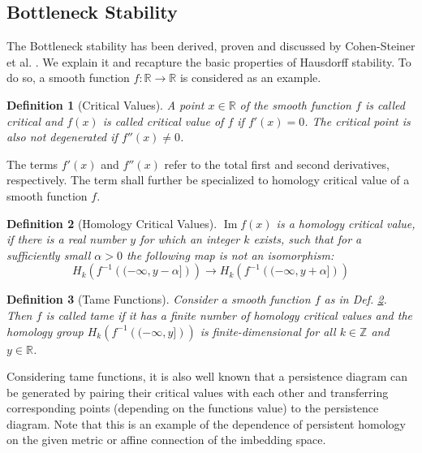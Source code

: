 \documentclass[journal]{IEEEtran}
\DeclareMathOperator{\Ima}{Im}
\newtheorem{definition}{Definition}[section]
\begin{document}
\subsection{Bottleneck Stability}
The Bottleneck stability has been derived, proven and discussed by Cohen-Steiner et al. \cite{Cohen-SteinerEH07}. We explain it and recapture the basic properties of Hausdorff stability. To do so, a smooth function $f: \mathbb{R} \rightarrow \mathbb{R}$ is considered as an example.

\begin{definition}[Critical Values]
A point $x \in \mathbb{R}$ of the smooth function $f$ is called critical and $f(x)$ is called critical value of $f$ if $f'(x) = 0$. The critical point is also not degenerated if $f''(x) \neq 0$.
\end{definition}

The terms $f'(x)$ and $f''(x)$ refer to the total first and second derivatives, respectively. The term shall further be specialized to homology critical value of a smooth function $f$.

\begin{definition}[Homology Critical Values]
\label{def:homcritval}
$\Ima f(x)$ is a homology critical value, if there is a real number $y$ for which an integer $k$ exists, such that for a sufficiently small $\alpha >0$ the following map is not an isomorphism:
\begin{equation}
H_k\left(f^{-1}\left((-\infty,y-\alpha]\right)\right)\rightarrow H_k\left(f^{-1}\left((-\infty,y+\alpha]\right)\right)
\end{equation}
\end{definition}

\begin{definition}[Tame Functions]
\label{def:tame}
Consider a smooth function $f$ as in Def. \ref{def:homcritval}. Then $f$ is called tame if it has a finite number of homology critical values and the homology group $H_k\left(f^{-1}\left((-\infty,y]\right)\right)$ is finite-dimensional for all $k\in \mathbb{Z}$ and $y \in \mathbb{R}$.
\end{definition}

Considering tame functions, it is also well known that a persistence diagram can be generated by pairing their critical values with each other and transferring corresponding points (depending on the functions value) to the persistence diagram. Note that this is an example of the dependence of persistent homology on the given metric or affine connection of the imbedding space.
\end{document}
